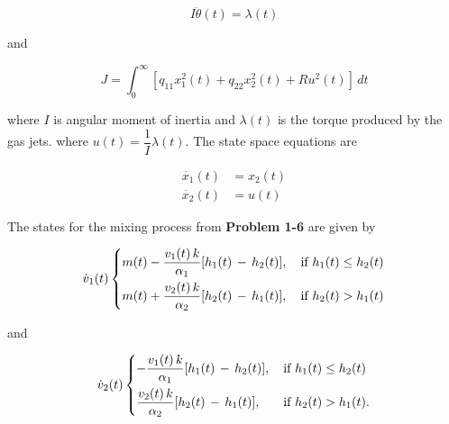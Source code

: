 \documentclass[12pt]{article}
\newenvironment{problem}[2][Problem]{\begin{trivlist}
\item[\hskip \labelsep {\bfseries #1}\hskip \labelsep {\bfseries #2.}]}{\end{trivlist}}
\newcommand\ddfrac[2]{\frac{\displaystyle #1}{\displaystyle #2}}
\begin{document}
\begin{equation}
    I \ddot{\theta}(t) = \lambda(t) \label{eq:spacecraft_acs}
\end{equation}

and

\begin{equation}
    J = \int_{0}^{\infty} [q_{11} x_1^2(t) + q_{22} x_2^2(t) + R u^2 (t)] \, dt 
    \label{eq:spacecraft_pf}
\end{equation}

\noindent where $I$ is angular moment of inertia and $\lambda(t)$ is the 
torque produced by the gas jets.
\noindent where $u(t) = \dfrac{1}{I} \lambda(t)$. The state space equations are

\begin{align}
    \dot{x_1}(t) &= x_2 (t) \label{eq:sc_ssr_s1} \\
    \dot{x_2}(t) &= u (t) \label{eq:sc_ssr_x2}
\end{align}


\newpage
\begin{problem}{2-1} %
\end{problem}
 
The states for the mixing process from \textbf{Problem 1-6} are given by

\begin{equation}
\dot{v}_1 (t) 
\begin{dcases}
    m(t) - \ddfrac{v_1(t) \, k}{\alpha _1 }[h_1(t) \, - \, h_2(t)],  \, & \text{if } h_1(t) \leq h_2(t) \\
    m(t) + \ddfrac{v_2(t) \, k}{\alpha _2 }[h_2(t) \, - \, h_1(t)],  \, & \text{if } h_2(t) > h_1(t) 
\end{dcases}
\end{equation}

and

\begin{equation}
\dot{v}_2 (t) 
\begin{dcases}
    - \ddfrac{v_1(t) \, k}{\alpha _1 }[h_1(t) \, - \, h_2(t)],  \, & \text{if } h_1(t) \leq h_2(t) \\ 
      \ddfrac{v_2(t) \, k}{\alpha _2 }[h_2(t) \, - \, h_1(t)],  \, & \text{if } h_2(t) > h_1(t). 
\end{dcases}
\end{equation}
\end{document}

